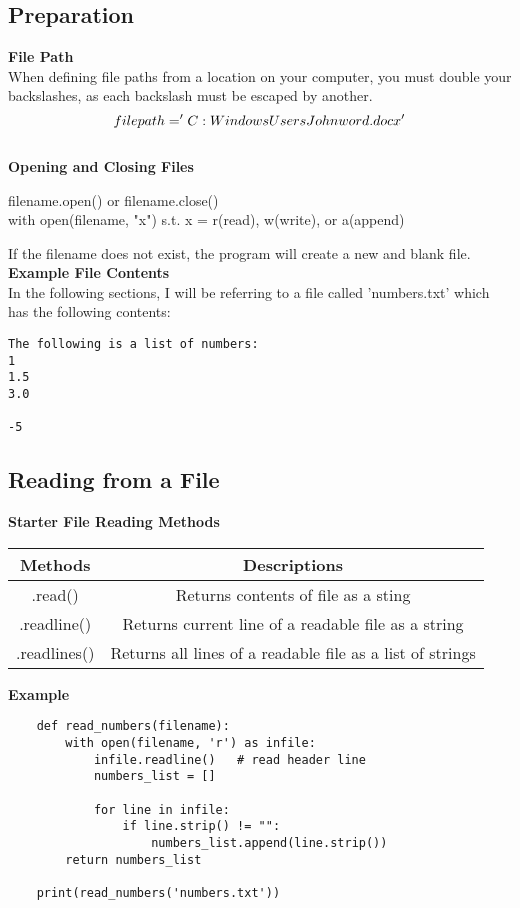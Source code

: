 \subsection{Preparation}
\textbf{File Path}\\
When defining file paths from a location on your computer, you must double your backslashes, as each backslash must be escaped by another.
\[filepath = 'C:\\Windows\\Users\\John\\word.docx'\]\\
\textbf{Opening and Closing Files}
\begin{center}
    filename.open() or filename.close()\\
    with open(filename, "x") s.t. x = r(read), w(write), or a(append)
\end{center}
If the filename does not exist, the program will create a new and blank file.
\vspace{0.3cm}
\textbf{Example File Contents}\\
In the following sections, I will be referring to a file called 'numbers.txt' which has the following contents:
\begin{verbatim}
The following is a list of numbers:
1
1.5
3.0

-5
\end{verbatim}
\vspace{-0.8cm}
\subsection{Reading from a File}
\textbf{Starter File Reading Methods}
\begin{center}
\begin{tabular}{c|c}
    Methods & Descriptions\\
    \hline
    .read() &  Returns contents of file as a sting\\
    .readline() & Returns current line of a readable file as a string\\
    .readlines() & Returns all lines of a readable file as a list of strings\\
\end{tabular}
\end{center}
\vspace{0.3cm}
\textbf{Example}

\begin{verbatim}
    def read_numbers(filename):
        with open(filename, 'r') as infile:
            infile.readline()   # read header line
            numbers_list = []

            for line in infile:
                if line.strip() != "":
                    numbers_list.append(line.strip())    
        return numbers_list
        
    print(read_numbers('numbers.txt'))
\end{verbatim}

